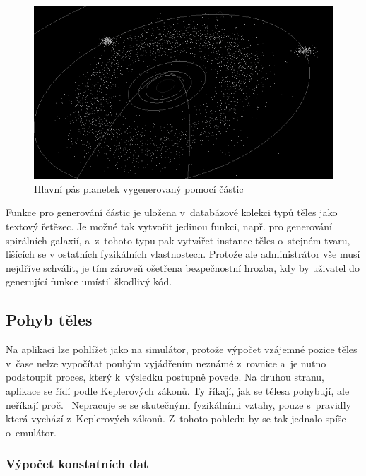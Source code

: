 \documentclass[a4paper,12pt]{article}
\begin{document}
\begin{figure}[H]
\begin{center}
\includegraphics[width=450pt]{Images/Particles.png}
\caption{Hlavní pás planetek vygenerovaný pomocí částic}
\end{center}
\end{figure}

Funkce pro generování částic je uložena v~databázové kolekci typů těles jako textový řetězec. Je možné tak vytvořit jedinou funkci, např. pro generování spirálních galaxií, a~z~tohoto typu pak vytvářet instance těles o~stejném tvaru, lišících se v ostatních fyzikálních vlastnostech. Protože ale administrátor vše musí nejdříve schválit, je tím zároveň ošetřena bezpečnostní hrozba, kdy by uživatel do generující funkce umístil škodlivý kód.



\vspace*{-0.6cm}
\subsection{Pohyb těles}

Na aplikaci lze pohlížet jako na simulátor, protože výpočet vzájemné pozice těles v~čase nelze vypočítat pouhým vyjádřením neznámé z~rovnice a~je nutno podstoupit proces, který k~výsledku postupně povede. Na druhou stranu, aplikace se řídí podle Keplerových zákonů. Ty říkají, jak se tělesa pohybují, ale neříkají proč.~\cite{kleczek} Nepracuje se se skutečnými fyzikálními vztahy, pouze s~pravidly která vychází z~Keplerových zákonů. Z~tohoto pohledu by se tak jednalo spíše o~emulátor.

\subsubsection{Výpočet konstatních dat}
\end{document}
